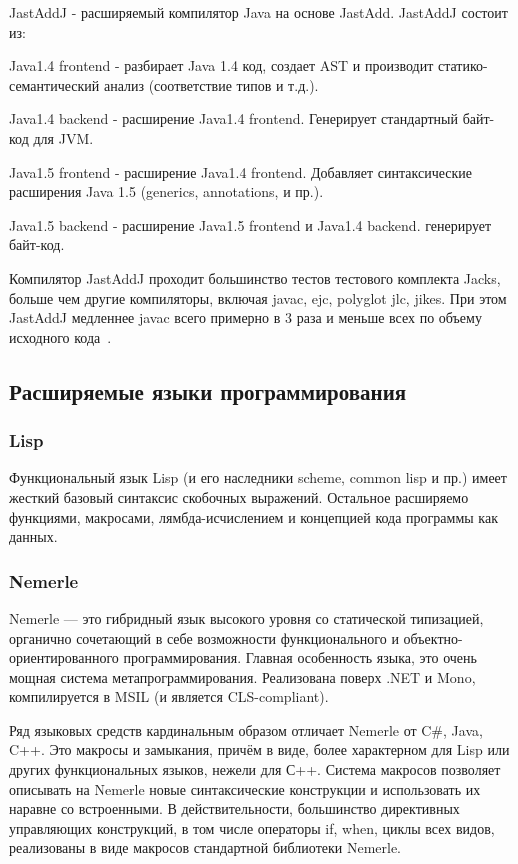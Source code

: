 \documentclass[a4paper,12pt]{article}
\begin{document}
JastAddJ - расширяемый компилятор Java на основе JastAdd.
JastAddJ состоит из:

Java1.4 frontend - разбирает Java 1.4 код, создает AST и производит
статико-семантический анализ (соответствие типов и т.д.).

Java1.4 backend - расширение Java1.4 frontend. Генерирует стандартный байт-код
для JVM.

Java1.5 frontend - расширение Java1.4 frontend. Добавляет синтаксические
расширения Java 1.5 (generics, annotations, и пр.).

Java1.5 backend - расширение Java1.5 frontend и Java1.4 backend. генерирует
байт-код.

Компилятор JastAddJ проходит большинство тестов тестового комплекта Jacks,
больше чем другие компиляторы, включая javac, ejc, polyglot jlc, jikes. При
этом JastAddJ медленнее javac всего примерно в 3 раза и меньше всех по объему
исходного кода~\cite{JastAddJ}.

\subsection{Расширяемые языки программирования}

\subsubsection{Lisp}
Функциональный язык Lisp (и его наследники scheme, common lisp и пр.) имеет
жесткий базовый синтаксис скобочных выражений. Остальное расширяемо функциями,
макросами, лямбда-исчислением и концепцией кода программы как данных.

\subsubsection{Nemerle}
Nemerle — это гибридный язык высокого уровня со статической типизацией,
органично сочетающий в себе возможности функционального и
объектно-ориентированного программирования. Главная особенность языка, это
очень мощная система метапрограммирования. Реализована поверх .NET и Mono,
компилируется в MSIL (и является CLS-compliant).

Ряд языковых средств кардинальным образом отличает Nemerle от C\#, Java, C++.
Это макросы и замыкания, причём в виде, более характерном для Lisp или других
функциональных языков, нежели для С++. Система макросов позволяет описывать на
Nemerle новые синтаксические конструкции и использовать их наравне со
встроенными. В действительности, большинство директивных управляющих
конструкций, в том числе операторы if, when, циклы всех видов, реализованы в
виде макросов стандартной библиотеки Nemerle.
\end{document}
